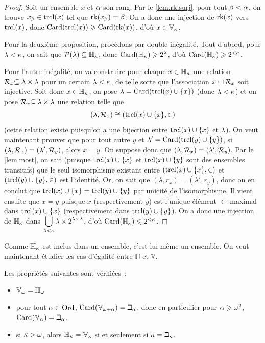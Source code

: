 \begin{proof}
  Soit un ensemble $x$ et $\alpha$ son rang. Par le \cref{lem.rk.surj}, pour
  tout $\beta < \alpha$, on trouve $x_\beta \in \operatorname{trcl}(x)$ tel que
  $\operatorname{rk}(x_\beta) = \beta$. On a donc une injection de $\operatorname{rk}(x)$ vers $\operatorname{trcl}(x)$,
  donc $\operatorname{Card}(\operatorname{trcl}(x)) \geqslant \operatorname{Card}(\operatorname{rk}(x))$, d'où $x \in \mathbb V_\kappa$.

  Pour la deuxième proposition, procédons par double inégalité. Tout d'abord,
  pour $\lambda < \kappa$, on sait que $\mathcal{P}(\lambda) \subseteq \mathbb H_\kappa$,
  donc $\operatorname{Card}(\mathbb H_\kappa) \geqslant 2^\lambda$, d'où $\operatorname{Card}(\mathbb H_\kappa) \geqslant 2^{<\kappa}$.

  Pour l'autre inégalité, on va construire pour chaque $x \in \mathbb H_\kappa$
  une relation $\mathrel{\mathcal{R}}_x \subseteq \lambda \times \lambda$ pour un certain
  $\lambda < \kappa$, de telle sorte que l'association $x \mapsto \mathrel{\mathcal{R}}_x$ soit
  injective. Soit donc $x \in \mathbb H_\kappa$, on pose
  $\lambda = \operatorname{Card}(\operatorname{trcl}(x)\cup \{x\})$ (donc $\lambda < \kappa$) et on pose
  $\mathrel{\mathcal{R}}_x\subseteq \lambda \times \lambda$ une relation telle que
  \[(\lambda,\mathrel{\mathcal{R}}_x)\cong (\operatorname{trcl}(x)\cup \{x\}, \in)\]
  (cette relation existe puisqu'on a une bijection entre $\operatorname{trcl}(x)\cup\{x\}$ et
  $\lambda$). On veut maintenant prouver que pour tout autre $y$ et
  $\lambda' = \operatorname{Card}(\operatorname{trcl}(y)\cup\{y\})$, si
  $(\lambda, \mathrel{\mathcal{R}}_x) = (\lambda',\mathrel{\mathcal{R}}_y)$, alors $x = y$. On suppose donc
  que $(\lambda, \mathrel{\mathcal{R}}_x) = (\lambda',\mathrel{\mathcal{R}}_y)$. Par le
  \cref{lem.most}, on sait (puisque $\operatorname{trcl}(x)\cup \{x\}$ et $\operatorname{trcl}(x)\cup \{y\}$
  sont des ensembles transitifs) que le seul isomorphisme existant entre
  $(\operatorname{trcl}(x)\cup \{x\},\in)$ et $(\operatorname{trcl}(y)\cup\{y\},\in)$ est l'identité. Or,
  on sait que $(\lambda,r_x) = (\lambda',r_y)$, donc on en conclut que
  $\operatorname{trcl}(x)\cup \{x\} = \operatorname{trcl}(y)\cup \{y\}$ par unicité de l'isomorphisme.
  Il vient ensuite que $x = y$ puisque $x$ (respectivement $y$) est l'unique
  élément $\in$-maximal dans $\operatorname{trcl}(x)\cup \{x\}$ (respectivement dans
  $\operatorname{trcl}(y)\cup\{y\}$). On a donc une injection de $\mathbb H_\kappa$ dans
  $\displaystyle\bigcup_{\lambda < \kappa}\lambda \times 2^{\lambda \times \lambda}$,
  d'où $\operatorname{Card}(\mathbb H_\kappa) \leqslant 2^{<\kappa}$.
\end{proof}

\noindent
Comme $\mathbb H_\kappa$ est inclus dans un ensemble, c'est lui-même un ensemble.
On veut maintenant étudier les cas d'égalité entre $\mathbb H$ et $\mathbb V$.

\begin{property}
  Les propriétés suivantes sont vérifiées~:
  \begin{itemize}
  \item $\mathbb V_\omega = \mathbb H_\omega$
  \item pour tout $\alpha\in\operatorname{Ord}$, $\operatorname{Card}(\mathbb V_{\omega + \alpha}) = \beth_\alpha$,
    donc en particulier pour $\alpha \geqslant \omega^2$, $\operatorname{Card}(\mathbb V_{\alpha}) = \beth_\alpha$.
  \item si $\kappa > \omega$, alors $\mathbb H_\kappa = \mathbb V_\kappa$ si et seulement si
    $\kappa = \beth_\kappa$.
  \end{itemize}
\end{property}

